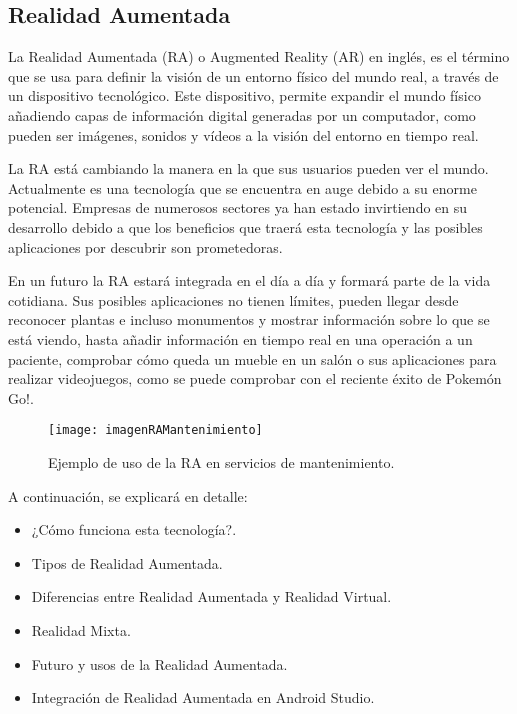 \subsection{Realidad Aumentada}

La Realidad Aumentada (RA) \cite{URL::RealidadAumentada} o Augmented Reality (AR) en inglés, es el término que se usa para definir la visión de un entorno físico del mundo real, a través de un dispositivo tecnológico. Este dispositivo, permite expandir el mundo físico añadiendo capas de información digital generadas por un computador, como pueden ser imágenes, sonidos y vídeos a la visión del entorno en tiempo real. 

La RA está cambiando la manera en la que sus usuarios pueden ver el mundo. Actualmente es una tecnología que se encuentra en auge debido a su enorme potencial. Empresas de numerosos sectores ya han estado invirtiendo en su desarrollo debido a que los beneficios que traerá esta tecnología y las posibles aplicaciones por descubrir son prometedoras.


En un futuro la RA estará integrada en el día a día y formará parte de la vida cotidiana. Sus posibles aplicaciones no tienen límites, pueden llegar desde reconocer plantas e incluso monumentos y mostrar información sobre lo que se está viendo, hasta añadir información en tiempo real en una operación a un paciente, comprobar cómo queda un mueble en un salón o sus aplicaciones para realizar videojuegos, como se puede comprobar con el reciente éxito de Pokemón Go!. 

\begin{figure}[h]
    \centering
    \texttt{[image: imagenRAMantenimiento]}
    \caption{Ejemplo de uso de la RA en servicios de mantenimiento.}
    \label{fig:googleglass}
\end{figure}

A continuación, se explicará en detalle:
\begin{itemize}
\item ¿Cómo funciona esta tecnología?.
\item Tipos de Realidad Aumentada.
\item Diferencias entre Realidad Aumentada y Realidad Virtual.
\item Realidad Mixta.
\item Futuro y usos de la Realidad Aumentada.
\item Integración de Realidad Aumentada en Android Studio.
\end{itemize}  

